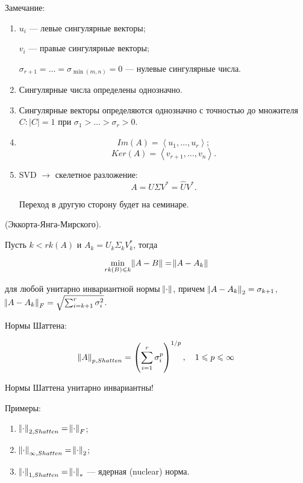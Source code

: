 Замечание:

\begin{enumerate}
    \item $u_i$ --- левые сингулярные векторы;

        $v_i$ --- правые сингулярные векторы;

        $\sigma_{r + 1} = \dots = \sigma_{\min(m, n)} = 0$ --- нулевые
        сингулярные числа.
    \item Сингулярные числа определены однозначно.
    \item Сингулярные векторы определяются однозначно с точностью до множителя
        $C: |C| = 1$ при $\sigma_1 > \dots > \sigma_r > 0$.
    \item
        \[
            Im(A) = \left< u_1, \dots, u_r \right>;
        \]
        \[
            Ker(A) = \left< v_{r + 1}, \dots, v_n \right>.
        \]
    \item SVD $\to$ скелетное разложение:
        \[
            A = U \Sigma V^* = \hat{U} V^*.
        \]

        Переход в другую сторону будет на семинаре.
\end{enumerate}

\begin{theorem} (Эккорта-Янга-Мирского).

    Пусть $k < rk(A)$ и $A_k = U_k \Sigma_k V_k^*$, тогда

    \[
        \min_{rk(B) \leqslant k} \norm{A - B} = \norm{A - A_k}
    \]

    для любой унитарно инвариантной нормы $\norm{\cdot}$, причем
    $\norm{A - A_k}_2 = \sigma_{k + 1}$,
    $\norm{A - A_k}_F = \sqrt{\sum_{i = k + 1}^r \sigma_i^2}$.
\end{theorem}

\begin{definition}
    Нормы Шаттена:

    \[
        \norm{A}_{p, Shatten} = \left( \sum_{i = 1}^r \sigma_i^p \right)^{1/p},
        \quad 1 \leqslant p \leqslant \infty
    \]
\end{definition}

Нормы Шаттена унитарно инвариантны!

Примеры:

\begin{enumerate}
    \item $\norm{\cdot}_{2, Shatten} = \norm{\cdot}_F$;
    \item $\norm{\cdot}_{\infty, Shatten} = \norm{\cdot}_2$;
    \item $\norm{\cdot}_{1, Shatten} = \norm{\cdot}_*$ --- ядерная (nuclear)
        норма.
\end{enumerate}

